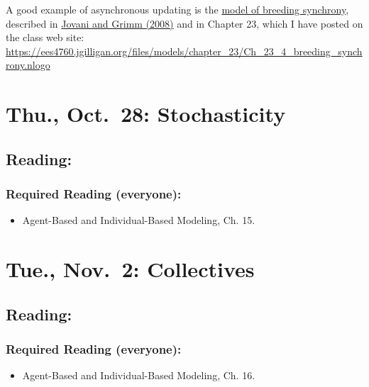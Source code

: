 \documentclass[
]{article}
\providecommand{\tightlist}{%
  \setlength{\itemsep}{0pt}\setlength{\parskip}{0pt}}
\begin{document}
A good example of asynchronous updating is the
\href{/files/models/chapter_23/Ch_23_4_breeding_synchrony.nlogo}{model
of breeding synchrony}, described in
\href{/files/models/chapter_05/Jovani_Grimm_2008_Breeding.pdf}{Jovani
and Grimm (2008)} and in Chapter 23, which I have posted on the class
web site:
\url{https://ees4760.jgilligan.org/files/models/chapter_23/Ch_23_4_breeding_synchrony.nlogo}

\hypertarget{thu.-oct.-28-stochasticity}{%
\section{Thu., Oct.~28:
Stochasticity}\label{thu.-oct.-28-stochasticity}}

\hypertarget{reading-17}{%
\subsection{Reading:}\label{reading-17}}

\hypertarget{required-reading-everyone-14}{%
\subsubsection{Required Reading
(everyone):}\label{required-reading-everyone-14}}

\begin{itemize}
\tightlist
\item
  Agent-Based and Individual-Based Modeling, Ch. 15.
\end{itemize}

\hypertarget{tue.-nov.-2-collectives}{%
\section{Tue., Nov.~2: Collectives}\label{tue.-nov.-2-collectives}}

\hypertarget{reading-18}{%
\subsection{Reading:}\label{reading-18}}

\hypertarget{required-reading-everyone-15}{%
\subsubsection{Required Reading
(everyone):}\label{required-reading-everyone-15}}

\begin{itemize}
\tightlist
\item
  Agent-Based and Individual-Based Modeling, Ch. 16.
\end{itemize}
\end{document}
